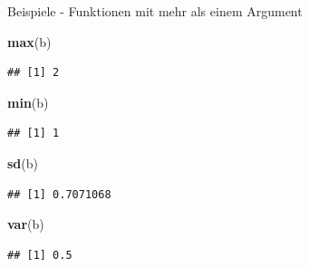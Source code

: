 \documentclass[ignorenonframetext,]{beamer}
\newenvironment{Shaded}{\begin{snugshade}}{\end{snugshade}}
\newcommand{\KeywordTok}[1]{\textcolor[rgb]{0.13,0.29,0.53}{\textbf{#1}}}
\newcommand{\NormalTok}[1]{#1}
\begin{document}
\begin{frame}[fragile]{Beispiele - Funktionen mit mehr als einem
Argument}
\protect\hypertarget{beispiele---funktionen-mit-mehr-als-einem-argument}{}

\begin{Shaded}
\begin{Highlighting}[]
\KeywordTok{max}\NormalTok{(b)}
\end{Highlighting}
\end{Shaded}

\begin{verbatim}
## [1] 2
\end{verbatim}

\begin{Shaded}
\begin{Highlighting}[]
\KeywordTok{min}\NormalTok{(b)}
\end{Highlighting}
\end{Shaded}

\begin{verbatim}
## [1] 1
\end{verbatim}

\begin{Shaded}
\begin{Highlighting}[]
\KeywordTok{sd}\NormalTok{(b)}
\end{Highlighting}
\end{Shaded}

\begin{verbatim}
## [1] 0.7071068
\end{verbatim}

\begin{Shaded}
\begin{Highlighting}[]
\KeywordTok{var}\NormalTok{(b)}
\end{Highlighting}
\end{Shaded}

\begin{verbatim}
## [1] 0.5
\end{verbatim}

\end{frame}
\end{document}
